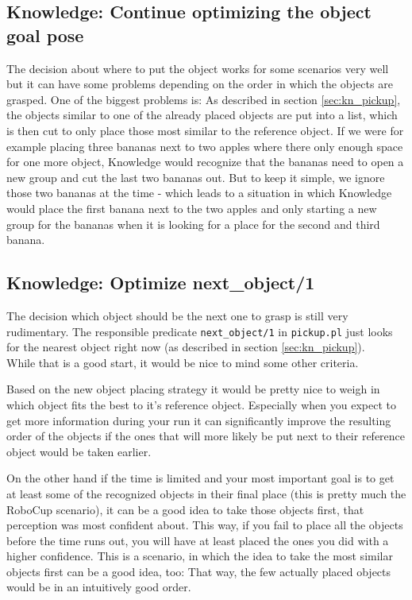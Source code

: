 \documentclass[main.tex]{subfiles}
\begin{document}
		
		\subsection{Knowledge: Continue optimizing the object goal pose}
		The decision about where to put the object works for some scenarios very well but it can have some problems depending on the order in which the objects are grasped. One of the biggest problems is: As described in section \ref{sec:kn_pickup}, the objects  similar to one of the already placed objects are put into a list, which is then cut to only place those most similar to the reference object. If we were for example placing three bananas next to two apples where there only enough space for one more object, Knowledge would recognize that the bananas need to open a new group and cut the last two bananas out. But to keep it simple, we ignore those two bananas at the time - which leads to a situation in which Knowledge would place the first banana next to the two apples and only starting a new group for the bananas when it is looking for a place for the second and third banana.
	  	
	  	\subsection{Knowledge: Optimize next\_object/1}
	  	The decision which object should be the next one to grasp is still very rudimentary. The responsible predicate \texttt{next\_object/1} in \texttt{pickup.pl} just looks for the nearest object right now (as described in section \ref{sec:kn_pickup}).\\
	  	While that is a good start, it would be nice to mind some other criteria.
	  	
	  	Based on the new object placing strategy it would be pretty nice to weigh in which object fits the best to it's reference object. Especially when you expect to get more information during your run it can significantly improve the resulting order of the objects if the ones that will more likely be put next to their reference object would be taken earlier.
	  	
		On the other hand if the time is limited and your most important goal is to get at least some of the recognized objects in their final place (this is pretty much the RoboCup scenario), it can be a good idea to take those objects first, that perception was most confident about. This way, if you fail to place all the objects before the time runs out, you will have at least placed the ones you did with a higher confidence. This is a scenario, in which the idea to take the most similar objects first can be a good idea, too: That way, the few actually placed objects would be in an intuitively good order.
		
\end{document}

